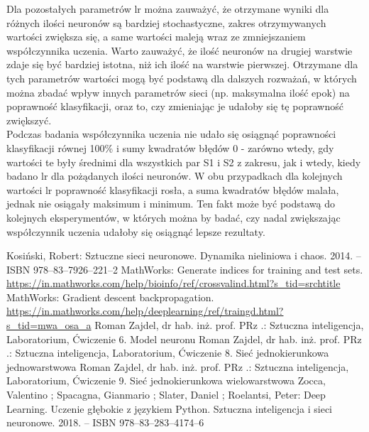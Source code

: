 \documentclass[a4paper, 12pt]{article}
\begin{document}
\clearpage
Dla pozostałych parametrów lr można zauważyć, że otrzymane wyniki dla różnych ilości neuronów są bardziej stochastyczne, zakres otrzymywanych wartości zwiększa się, a same wartości maleją wraz ze zmniejszaniem współczynnika uczenia. Warto zauważyć, że ilość neuronów na drugiej warstwie zdaje się być bardziej istotna, niż ich ilość na warstwie pierwszej. Otrzymane dla tych parametrów wartości mogą być podstawą dla dalszych rozważań, w których można zbadać wpływ innych parametrów sieci (np. maksymalna ilość epok) na poprawność klasyfikacji, oraz to, czy zmieniając je udałoby się tę poprawność zwiększyć.\\
Podczas badania współczynnika uczenia nie udało się osiągnąć poprawności klasyfikacji równej 100\% i sumy kwadratów błędów 0 - zarówno wtedy, gdy wartości te były średnimi dla wszystkich par S1 i S2 z zakresu, jak i wtedy, kiedy badano lr dla pożądanych ilości neuronów. W obu przypadkach dla kolejnych wartości lr poprawność klasyfikacji rosła, a suma kwadratów błędów malała, jednak nie osiągały maksimum i minimum. Ten fakt może być podstawą do kolejnych eksperymentów, w których można by badać, czy nadal zwiększając współczynnik uczenia udałoby się osiągnąć lepsze rezultaty.


\clearpage


\begin{thebibliography}{4}
 Kosiński, Robert: Sztuczne sieci neuronowe. Dynamika nieliniowa i chaos. 2014. – ISBN 978–83–7926–221–2
 MathWorks: Generate indices for training and test sets. \url{https://in.mathworks.com/help/bioinfo/ref/crossvalind.html?s_tid=srchtitle}
 MathWorks: Gradient descent backpropagation. \url{https://in.mathworks.com/help/deeplearning/ref/traingd.html?s_tid=mwa_osa_a}
 Roman Zajdel, dr hab. inż. prof. PRz .: Sztuczna inteligencja, Laboratorium, Ćwiczenie 6. Model neuronu
 Roman Zajdel, dr hab. inż. prof. PRz .: Sztuczna inteligencja, Laboratorium, Ćwiczenie 8. Sieć jednokierunkowa jednowarstwowa
 Roman Zajdel, dr hab. inż. prof. PRz .: Sztuczna inteligencja, Laboratorium, Ćwiczenie 9. Sieć jednokierunkowa wielowarstwowa
 Zocca, Valentino ; Spacagna, Gianmario ; Slater, Daniel ; Roelantsi, Peter: Deep Learning. Uczenie głębokie z językiem Python. Sztuczna inteligencja i sieci neuronowe. 2018. –  ISBN 978–83–283–4174–6
\end{thebibliography}

\clearpage
\end{document}
